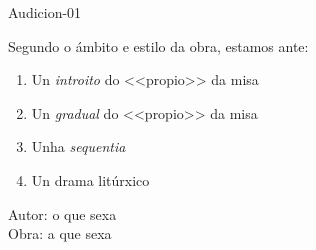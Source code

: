 \begin{defproblem}{Audicion-01}
\begin{ejercicio}[]
\begin{enumerate}[1.-]
\begin{multicols}{2}
\begin{enumerate}[a)]
				\small{
				Segundo o ámbito e estilo da obra, estamos ante:
				}
				\begin{enumerate}
				 \item
				 \small{Un \emph{introito} do <<propio>> da misa}
				 \item
				 \small{Un \emph{gradual} do <<propio>> da misa}
				 \item
				 \small{Unha \emph{sequentia}}
				 \item
				 \small{Un drama litúrxico}
				\end{enumerate}
		    \end{enumerate}
%			
       \end{multicols}
\par \vspace{0.3cm}
	\end{enumerate}
\end{ejercicio}

\begin{onlysolution}
    \begin{solution}
Autor: o que sexa\\
Obra: a que sexa\\
    \end{solution}
\end{onlysolution}

\end{defproblem}
% 
